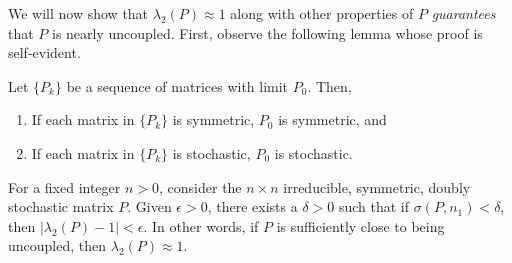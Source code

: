 \documentclass[final]{siamltex}
\begin{document}
We will now show that $\lambda_{2}(P) \approx 1$ along with other properties of $P$ \emph{guarantees} that $P$ is nearly uncoupled. First, observe the following lemma whose proof is self-evident.

\begin{lemma} \label{lem:sym}
Let $\{P_{k}\}$ be a sequence of matrices with limit $P_{0}$. Then,
\begin{enumerate}
\item If each matrix in $\{P_{k}\}$ is symmetric, $P_{0}$ is symmetric, and
\item If each matrix in $\{P_{k}\}$ is stochastic, $P_{0}$ is stochastic.
\end{enumerate}
\end{lemma}

\begin{theorem} \label{thm:hgeasy} 
For a fixed integer $n > 0$, consider the $n \times n$ irreducible, symmetric, doubly stochastic matrix $P$. Given $\epsilon > 0$, there exists a $\delta > 0$ such that if $\sigma(P,n_{1}) < \delta$, then $|\lambda_{2}(P)-1| < \epsilon$. In other words, if $P$ is sufficiently close to being uncoupled, then $\lambda_{2}(P) \approx 1$.
\end{theorem}
\end{document}
